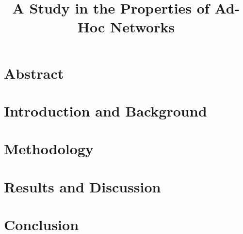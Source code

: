 \documentclass[10pt,titlepage]{article}
\author{\authorship}
\title{A Study in the Properties of Ad-Hoc Networks}
\begin{document}
    \maketitle

    \pagebreak
    \tableofcontents
    
    \pagebreak
    \section{Abstract}
    
    
    \section{Introduction and Background}
    
    
    \pagebreak
    \section{Methodology}
    
    
    \pagebreak
    \section{Results and Discussion}
    
    
    \pagebreak
    \section{Conclusion}
    

    \pagebreak
    \appendix
    \renewcommand{\thesection}{\Alph{section}}
    
    
    \pagebreak
    \small
    {}
    
\end{document}
